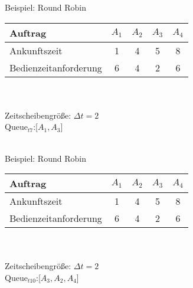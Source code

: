 \begin{frame}{Beispiel: Round Robin}
	\begin{tabular}{l||c|c|c|c}
		Auftrag               & \(A_1\)  & \(A_2\)  & \(A_3\) & \(A_4\) \\ \hline \hline
		Ankunftszeit		  & 1        &  4		& 5       & 8       \\ \hline
		Bedienzeitanforderung & 6        &  4       & 2       & 6       \\
	\end{tabular}\quad \\ \quad \\
	Zeitscheibengröße: \(\Delta t = 2\) \\
	Queue\(_{t7}\):[\(A_1, A_3\)] \\
	\quad \\
	\begin{center}
	\begin{blockgraph}{25}{1}{0.4}
    
    \end{blockgraph}
	\end{center}
\end{frame}

\begin{frame}{Beispiel: Round Robin}
	\begin{tabular}{l||c|c|c|c}
		Auftrag               & \(A_1\)  & \(A_2\)  & \(A_3\) & \(A_4\) \\ \hline \hline
		Ankunftszeit		  & 1        &  4		& 5       & 8       \\ \hline
		Bedienzeitanforderung & 6        &  4       & 2       & 6       \\
	\end{tabular}\quad \\ \quad \\
	Zeitscheibengröße: \(\Delta t = 2\) \\
	Queue\(_{t10}\):[\(A_3, A_2,A_4\)] \\
	\quad \\
	\begin{center}
	\begin{blockgraph}{25}{1}{0.4}
    
    \end{blockgraph}
	\end{center}
\end{frame}

